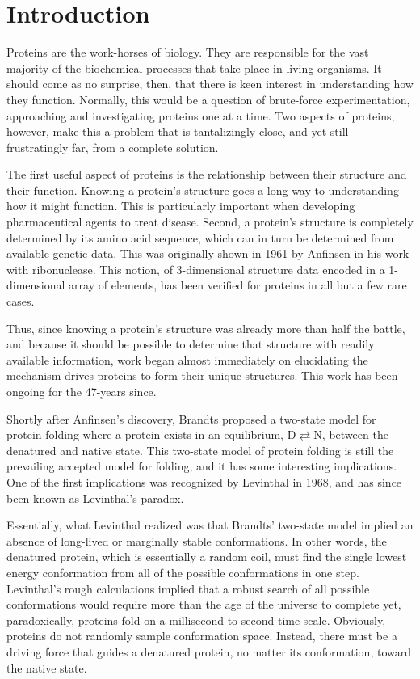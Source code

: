 \section*{Introduction}
\label{sec:introduction}
Proteins are the work-horses of biology. They are responsible for the vast majority of the biochemical processes that take place in living organisms. It should come as no surprise, then, that there is keen interest in understanding how they function. Normally, this would be a question of brute-force experimentation, approaching and investigating proteins one at a time. Two aspects of proteins, however, make this a problem that is tantalizingly close, and yet still frustratingly far, from a complete solution.

The first useful aspect of proteins is the relationship between their structure and their function. Knowing a protein's structure goes a long way to understanding how it might function. This is particularly important when developing pharmaceutical agents to treat disease. Second, a protein's structure is completely determined by its amino acid sequence, which can in turn be determined from available genetic data. This was originally shown in 1961 by Anfinsen \cite{Service:2008p294} in his work with ribonuclease. This notion, of 3-dimensional structure data encoded in a 1-dimensional array of elements, has been verified for proteins in all but a few rare cases.

Thus, since knowing a protein's structure was already more than half the battle, and because it should be possible to determine that structure with readily available information, work began almost immediately on elucidating the mechanism drives proteins to form their unique structures. This work has been ongoing for the 47-years since.

Shortly after Anfinsen's discovery, Brandts proposed a two-state model for protein folding where a protein exists in an equilibrium, $\mathbf{\mathrm{D}} \rightleftarrows \mathbf{\mathrm{N}}$, between the denatured and native state\cite{Clark:2008p141}. This two-state model of protein folding is still the prevailing accepted model for folding, and it has some interesting implications. One of the first implications was recognized by Levinthal in 1968, and has since been known as Levinthal's paradox.

Essentially, what Levinthal realized was that Brandts' two-state model implied an absence of long-lived or marginally stable conformations. In other words, the denatured protein, which is essentially a random coil, must find the single lowest energy conformation from all of the possible conformations in one step. Levinthal's rough calculations implied that a robust search of all possible conformations would require more than the age of the universe to complete yet, paradoxically, proteins fold on a millisecond to second time scale. Obviously, proteins do not randomly sample conformation space. Instead, there must be a driving force that guides a denatured protein, no matter its conformation, toward the native state.

